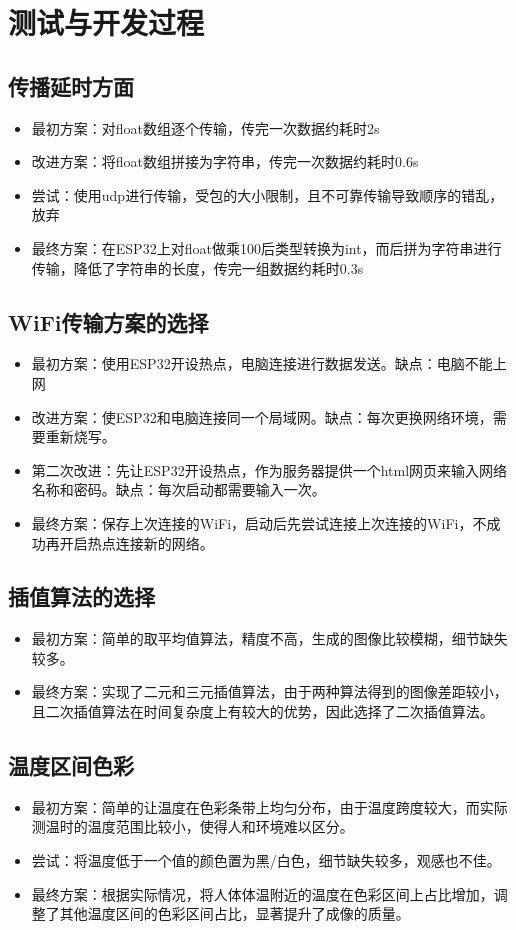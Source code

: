 \chapter{测试与开发过程}
\section{传播延时方面}
\begin{itemize}
    \item 最初方案：对float数组逐个传输，传完一次数据约耗时2s
    \item 改进方案：将float数组拼接为字符串，传完一次数据约耗时0.6s
    \item 尝试：使用udp进行传输，受包的大小限制，且不可靠传输导致顺序的错乱，放弃
    \item 最终方案：在ESP32上对float做乘100后类型转换为int，而后拼为字符串进行传输，降低了字符串的长度，传完一组数据约耗时0.3s
    \end{itemize}
\section{WiFi传输方案的选择}
\begin{itemize}
    \item 最初方案：使用ESP32开设热点，电脑连接进行数据发送。缺点：电脑不能上网
    \item 改进方案：使ESP32和电脑连接同一个局域网。缺点：每次更换网络环境，需要重新烧写。
    \item 第二次改进：先让ESP32开设热点，作为服务器提供一个html网页来输入网络名称和密码。缺点：每次启动都需要输入一次。
    \item 最终方案：保存上次连接的WiFi，启动后先尝试连接上次连接的WiFi，不成功再开启热点连接新的网络。
    \end{itemize}
\section{插值算法的选择}
\begin{itemize}
    \item 最初方案：简单的取平均值算法，精度不高，生成的图像比较模糊，细节缺失较多。
    \item 最终方案：实现了二元和三元插值算法，由于两种算法得到的图像差距较小，且二次插值算法在时间复杂度上有较大的优势，因此选择了二次插值算法。
    \end{itemize}
\section{温度区间色彩}
\begin{itemize}
    \item 最初方案：简单的让温度在色彩条带上均匀分布，由于温度跨度较大，而实际测温时的温度范围比较小，使得人和环境难以区分。
    \item 尝试：将温度低于一个值的颜色置为黑/白色，细节缺失较多，观感也不佳。
    \item 最终方案：根据实际情况，将人体体温附近的温度在色彩区间上占比增加，调整了其他温度区间的色彩区间占比，显著提升了成像的质量。
    \end{itemize}
